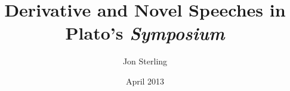 \documentclass[letterpaper, 12pt]{article}
\begin{document}
\doublespacing

\author{Jon Sterling}

\title{Derivative and Novel Speeches in Plato's \emph{Symposium}}
\date{April 2013}
\maketitle


\nocite{1985plato}


\end{document}
